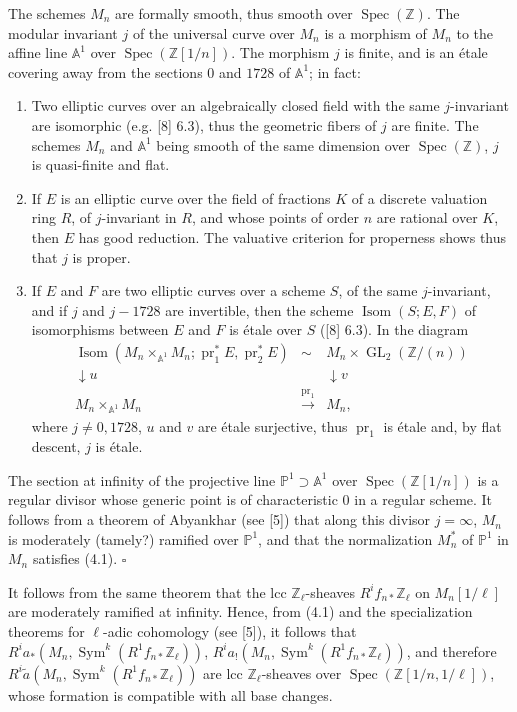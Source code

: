 \documentclass[10pt]{article}
\newcommand{\Z}{\mathbb Z}
\newcommand{\GL}{\operatorname{GL}}
\newcommand{\Isom}{\operatorname{Isom}}
\newcommand{\Sym}{\operatorname{Sym}}
\newcommand{\Spec}{\operatorname{Spec}}
\newcommand{\QED}{\hfill$\square$}
\begin{document}
The schemes $M_n$ are formally smooth, thus smooth over $\Spec(\Z)$. The modular invariant $j$ of the universal curve over $M_n$ is a morphism of $M_n$ to the affine line $\mathbb A^1$ over $\Spec(\Z[1/n])$. The morphism $j$ is finite, and is an étale covering away from the sections $0$ and $1728$ of $\mathbb A^1$; in fact:
\begin{enumerate}[label=(\alph*)]
\item Two elliptic curves over an algebraically closed field with the same $j$-invariant are isomorphic (e.g. [8] 6.3), thus the geometric fibers of $j$ are finite. The schemes $M_n$ and $\mathbb A^1$ being smooth of the same dimension over $\Spec(\Z)$, $j$ is quasi-finite and flat.
\item If $E$ is an elliptic curve over the field of fractions $K$ of a discrete valuation ring $R$, of $j$-invariant in $R$, and whose points of order $n$ are rational over $K$, then $E$ has good reduction. The valuative criterion for properness shows thus that $j$ is proper.
\item If $E$ and $F$ are two elliptic curves over a scheme $S$, of the same $j$-invariant, and if $j$ and $j-1728$ are invertible, then the scheme $\Isom(S;E,F)$ of isomorphisms between $E$ and $F$ is étale over $S$ ([8] 6.3). In the diagram
\[
\begin{array}{ccc}
\Isom(M_n\times_{\mathbb A^1}M_n;\operatorname{pr}_1^*E,\operatorname{pr}_2^*E) & \sim & M_n\times \GL_2(\Z/(n))\\
\downarrow u && \downarrow v\\
M_n\times_{\mathbb A^1}M_n&\xrightarrow{\operatorname{pr}_1}&M_n,
\end{array}
\]
where $j\ne 0,1728$, $u$ and $v$ are étale surjective, thus $\operatorname{pr}_1$ is étale and, by flat descent, $j$ is étale.
\end{enumerate}
The section at infinity of the projective line $\mathbb P^1\supset \mathbb A^1$ over $\Spec(\Z[1/n])$ is a regular divisor whose generic point is of characteristic $0$ in a regular scheme. It follows from a theorem of Abyankhar (see [5]) that along this divisor $j=\infty$, $M_n$ is moderately (tamely?) ramified over $\mathbb P^1$, and that the normalization $M_n^*$ of $\mathbb P^1$ in $M_n$ satisfies (4.1). \QED

It follows from the same theorem that the lcc $\Z_\ell$-sheaves $R^if_{n*}\Z_\ell$ on $M_n[1/\ell]$ are moderately ramified at infinity. Hence, from (4.1) and the specialization theorems for $\ell$-adic cohomology (see [5]), it follows that $R^ia_*(M_n,\Sym^k(R^1f_{n*}\Z_\ell))$, $R^ia_!(M_n,\Sym^k(R^1f_{n*}\Z_\ell))$, and therefore $R^i\widetilde a(M_n,\Sym^k(R^1f_{n*}\Z_\ell))$ are lcc $\Z_\ell$-sheaves over $\Spec(\Z[1/n,1/\ell])$, whose formation is compatible with all base changes.
\end{document}
